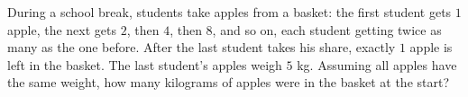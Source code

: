During a school break, students take apples from a basket: the first student gets $1$ apple, the next gets $2$, then $4$, then $8$, and so on, each student getting twice as many as the one before. After the last student takes his share, exactly $1$ apple is left in the basket. The last student's apples weigh $5$ kg. Assuming all apples have the same weight, how many kilograms of apples were in the basket at the start?
